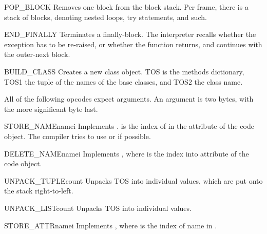 \begin{opcodedesc}{POP_BLOCK}{}
Removes one block from the block stack.  Per frame, there is a 
stack of blocks, denoting nested loops, try statements, and such.
\end{opcodedesc}

\begin{opcodedesc}{END_FINALLY}{}
Terminates a finally-block.  The interpreter recalls whether the
exception has to be re-raised, or whether the function returns,
and continues with the outer-next block.
\end{opcodedesc}

\begin{opcodedesc}{BUILD_CLASS}{}
Creates a new class object.  TOS is the methods dictionary, TOS1
the tuple of the names of the base classes, and TOS2 the class name.
\end{opcodedesc}

All of the following opcodes expect arguments.  An argument is two
bytes, with the more significant byte last.

\begin{opcodedesc}{STORE_NAME}{namei}
Implements .  is the index of 
in the attribute  of the code object.
The compiler tries to use  or 
if possible.
\end{opcodedesc}

\begin{opcodedesc}{DELETE_NAME}{namei}
Implements , where  is the index into
 attribute of the code object.
\end{opcodedesc}

\begin{opcodedesc}{UNPACK_TUPLE}{count}
Unpacks TOS into  individual values, which are put onto
the stack right-to-left.
\end{opcodedesc}

\begin{opcodedesc}{UNPACK_LIST}{count}
Unpacks TOS into  individual values.
\end{opcodedesc}


\begin{opcodedesc}{STORE_ATTR}{namei}
Implements , where  is the index
of name in .
\end{opcodedesc}

